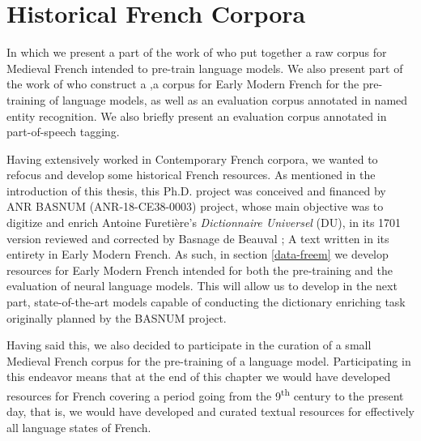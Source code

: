 \chapter{Historical French Corpora}\label{chap:historical}

\begin{center}
    \begin{minipage}{0.66\textwidth}
        \begin{small}
            In which we present a part of the work of \citet{grobol-etal-2022-bertrade} who put together a raw corpus for Medieval French intended to pre-train language models. We also present part of the work of \citet{gabay-etal-2022-from} who construct a \freemmax,a corpus for Early Modern French for the pre-training of language models, as well as \freemner an evaluation corpus annotated in named entity recognition. We also briefly present \freemlpm an evaluation corpus annotated in part-of-speech tagging.
        \end{small}
    \end{minipage}
    \vspace{0.5cm}
\end{center}

Having extensively worked in Contemporary French corpora, we wanted to refocus and develop some historical French resources. As mentioned in the introduction of this thesis, this Ph.D. project was conceived and financed by ANR BASNUM (ANR-18-CE38-0003) project, whose main objective was to digitize and enrich Antoine Furetière's \emph{Dictionnaire Universel} (DU), in its 1701 version reviewed and corrected by Basnage de Beauval \citep{furetiere-1701-dictionnaire}; A text written in its entirety in Early Modern French. As such, in section \ref{data-freem} we develop resources for Early Modern French intended for both the pre-training and the evaluation of neural language models. This will allow us to develop in the next part, state-of-the-art models capable of conducting the dictionary enriching task originally planned by the BASNUM project.

Having said this, we also decided to participate in the curation of a small Medieval French corpus for the pre-training of a language model. Participating in this endeavor means that at the end of this chapter we would have developed resources for French covering a period going from the 9\textsuperscript{th} century to the present day, that is, we would have developed and curated textual resources for effectively all language states of French.

